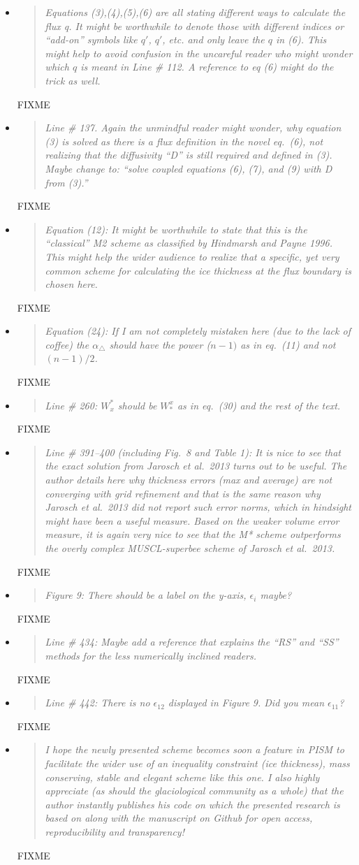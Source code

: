 \documentclass[11pt,reqno]{amsart}
\newcommand{\reply}[2]{
\medskip\medskip
\item  \begin{quote}
\emph{#1}
\end{quote}

\medskip
\noindent #2}
\begin{document}
\begin{itemize}
\reply{Equations (3),(4),(5),(6) are all stating different ways to calculate the flux q. It might be worthwhile to denote those with different indices or ``add-on'' symbols like $q'$, $q'$, etc. and only leave the $q$ in (6). This might help to avoid confusion in the uncareful reader who might wonder which $q$ is meant in Line \# 112. A reference to eq (6) might do the trick as well.}
{FIXME}

\reply{Line \# 137. Again the unmindful reader might wonder, why equation (3) is solved as there is a flux definition in the novel eq.~(6), not realizing that the diffusivity ``D'' is still required and defined in (3). Maybe change to: ``solve coupled equations (6), (7), and (9) with D from (3).''}
{FIXME}

\reply{Equation (12): It might be worthwhile to state that this is the ``classical'' M2 scheme as classified by Hindmarsh and Payne 1996. This might help the wider audience to realize that a specific, yet very common scheme for calculating the ice thickness at the flux boundary is chosen here.}
{FIXME}

\reply{Equation (24): If I am not completely mistaken here (due to the lack of coffee) the $\alpha_\triangle$ should have the power ($n-1)$ as in eq.~(11) and not $(n-1)/2$.}
{FIXME}

\reply{Line \# 260: $W^*_x$ should be $W^x_*$ as in eq.~(30) and the rest of the text.}
{FIXME}

\reply{Line \# 391--400 (including Fig.~8 and Table 1): It is nice to see that the exact solution from Jarosch et al.~2013 turns out to be useful.  The author details here why thickness errors (max and average) are not converging with grid refinement and that is the same reason why Jarosch et al.~2013 did not report such error norms, which in hindsight might have been a useful measure.  Based on the weaker volume error measure, it is again very nice to see that the M* scheme outperforms the overly complex MUSCL-superbee scheme of Jarosch et al.~2013.}
{FIXME}

\reply{Figure 9: There should be a label on the y-axis, $\epsilon_i$ maybe?}
{FIXME}

\reply{Line \# 434: Maybe add a reference that explains the ``RS'' and ``SS'' methods for the less numerically inclined readers.}
{FIXME}

\reply{Line \# 442: There is no $\epsilon_{12}$ displayed in Figure 9.  Did you mean $\epsilon_{11}$?}
{FIXME}

\reply{I hope the newly presented scheme becomes soon a feature in PISM to facilitate the wider use of an inequality constraint (ice thickness), mass conserving, stable and elegant scheme like this one. I also highly appreciate (as should the glaciological community as a whole) that the author instantly publishes his code on which the presented research is based on along with the manuscript on Github for open access, reproducibility and transparency!}
{FIXME}
\end{itemize}
\end{document}
